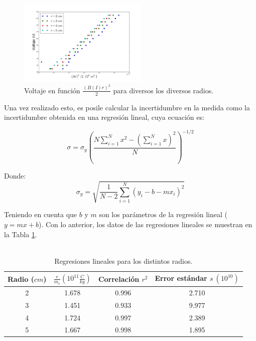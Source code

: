 \documentclass[prb,aps,twocolumn,preprintnumbers,amsmath,amssymb]{revtex4}
\begin{document}
\begin{figure}[h!]
	\centering
	\includegraphics[width=0.55\textwidth]{carga-masa-reg}
	\caption{Voltaje en función $\frac{(B(I)r)^2}{2}$ para diversos los diversos radios.}
	\label{fig:lineal}
\end{figure}

Una vez realizado esto, es posile calcular la incertidumbre en la medida como la incertidumbre obtenida en una regresión lineal, cuya ecuación es:

\begin{equation}
\sigma = \sigma_y \left(\frac{N \sum_{i=1}^{N} x^2 - ( \sum_{i=1}^{N} x)^2}{N} \right)^{-1/2}
\end{equation}

Donde:
\begin{equation}
\sigma_y = \sqrt{\frac{1}{N-2} \sum_{i=1}^{N}(y_i -b -mx_i)^2}
\end{equation}

Teniendo en cuenta que $b$ y $m$ son los parámetros de la regresión lineal ( $y = mx + b$). Con lo anterior, los datos de las regresiones lineales se muestran en la Tabla \ref{Tabla 2}. \\\\ 

\begin{table}[h!]
	\caption{\label{Tabla 2}Regresiones lineales para los distintos radios.}
	\begin{ruledtabular}
		\begin{tabular}{cccc}
			Radio ($cm$) & $\frac{e}{m_{e}} (10^{11} \frac{C}{kg})$ & Correlación $r^2$ & Error estándar $s\ (10^{10})$ \\
			\hline
			2 & 1.678 & 0.996 & 2.710 \\
			3 & 1.451 & 0.933 & 9.977 \\
			4 & 1.724 & 0.997 & 2.389 \\
			5 & 1.667 & 0.998 & 1.895 \\
		\end{tabular}
	\end{ruledtabular}
\end{table}
\end{document}
